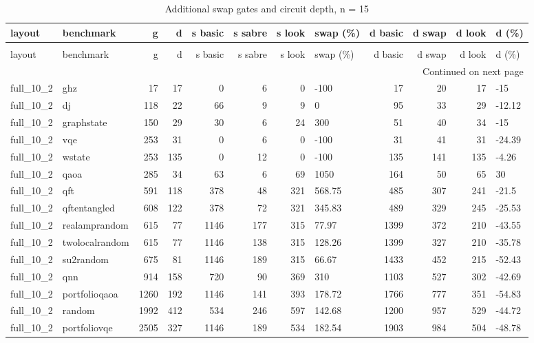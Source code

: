 \begin{longtable}{llrrrrrlrrrl}
\caption{Additional swap gates and circuit depth, n = 15} \label{benchmark-table-15} \\
\toprule
layout & benchmark & g & d & s basic & s sabre & s look & swap (\%) & d basic & d swap & d look & d (\%) \\
\midrule
\endfirsthead
\caption[]{Additional swap gates and circuit depth, n = 15} \\
\toprule
layout & benchmark & g & d & s basic & s sabre & s look & swap (\%) & d basic & d swap & d look & d (\%) \\
\midrule
\endhead
\midrule
\multicolumn{12}{r}{Continued on next page} \\
\midrule
\endfoot
\bottomrule
\endlastfoot
full\_10\_2 & ghz & 17 & 17 & 0 & 6 & 0 & -100 & 17 & 20 & 17 & -15 \\
full\_10\_2 & dj & 118 & 22 & 66 & 9 & 9 & 0 & 95 & 33 & 29 & -12.12 \\
full\_10\_2 & graphstate & 150 & 29 & 30 & 6 & 24 & 300 & 51 & 40 & 34 & -15 \\
full\_10\_2 & vqe & 253 & 31 & 0 & 6 & 0 & -100 & 31 & 41 & 31 & -24.39 \\
full\_10\_2 & wstate & 253 & 135 & 0 & 12 & 0 & -100 & 135 & 141 & 135 & -4.26 \\
full\_10\_2 & qaoa & 285 & 34 & 63 & 6 & 69 & 1050 & 164 & 50 & 65 & 30 \\
full\_10\_2 & qft & 591 & 118 & 378 & 48 & 321 & 568.75 & 485 & 307 & 241 & -21.5 \\
full\_10\_2 & qftentangled & 608 & 122 & 378 & 72 & 321 & 345.83 & 489 & 329 & 245 & -25.53 \\
full\_10\_2 & realamprandom & 615 & 77 & 1146 & 177 & 315 & 77.97 & 1399 & 372 & 210 & -43.55 \\
full\_10\_2 & twolocalrandom & 615 & 77 & 1146 & 138 & 315 & 128.26 & 1399 & 327 & 210 & -35.78 \\
full\_10\_2 & su2random & 675 & 81 & 1146 & 189 & 315 & 66.67 & 1433 & 452 & 215 & -52.43 \\
full\_10\_2 & qnn & 914 & 158 & 720 & 90 & 369 & 310 & 1103 & 527 & 302 & -42.69 \\
full\_10\_2 & portfolioqaoa & 1260 & 192 & 1146 & 141 & 393 & 178.72 & 1766 & 777 & 351 & -54.83 \\
full\_10\_2 & random & 1992 & 412 & 534 & 246 & 597 & 142.68 & 1200 & 957 & 529 & -44.72 \\
full\_10\_2 & portfoliovqe & 2505 & 327 & 1146 & 189 & 534 & 182.54 & 1903 & 984 & 504 & -48.78 \\

\end{longtable}
